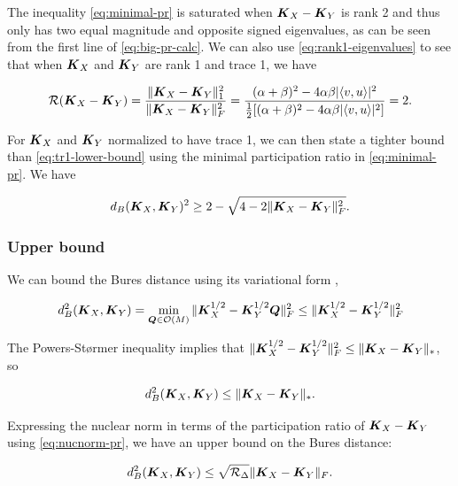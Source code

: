 The inequality \cref{eq:minimal-pr} is saturated when $\boldsymbol{K}_X-\boldsymbol{K}_Y$ is rank 2 and thus only has two equal magnitude and opposite signed eigenvalues, as can be seen from the first line of \cref{eq:big-pr-calc}.  
We can also use \cref{eq:rank1-eigenvalues} to see that when $\boldsymbol{K}_X$ and $\boldsymbol{K}_Y$ are rank 1 and trace 1, we have

\begin{equation}
    \mathcal{R}(\boldsymbol{K}_X-\boldsymbol{K}_Y) = \frac{\| \boldsymbol{K}_X-\boldsymbol{K}_Y \|_{1}^{2} }{\| \boldsymbol{K}_X-\boldsymbol{K}_Y \|_F^2}  =\frac{ (\alpha + \beta)^2 - 4 \alpha \beta \lvert \langle v,u \rangle \lvert^2}{\frac{1}{2} [(\alpha + \beta)^2 - 4 \alpha \beta \lvert \langle v,u \rangle \lvert^2]} = 2.
\end{equation}

For $\boldsymbol{K}_X$ and $\boldsymbol{K}_Y$ normalized to have trace 1, we can then state a tighter bound than \cref{eq:tr1-lower-bound} using the minimal participation ratio in \cref{eq:minimal-pr}.  We have

\begin{equation}
        d_B(\boldsymbol{K}_X,\boldsymbol{K}_Y)^2 \ge 2 - \sqrt{4 - 2 \|\boldsymbol{K}_X-\boldsymbol{K}_Y \|_F^2}.
\end{equation}



\subsubsection{Upper bound}

We can bound the Bures distance using its variational form \cite{Bhatia2019},

\begin{equation}\label{eq:bures-variational}
d_B^2(\boldsymbol{K}_X,\boldsymbol{K}_Y) = \min_{\boldsymbol{Q} \in \mathcal{O}(M)} \|\boldsymbol{K}_X^{1/2} - \boldsymbol{K}_Y^{1/2}\boldsymbol{Q} \|_F^2 \le  \|\boldsymbol{K}_X^{1/2} - \boldsymbol{K}_Y^{1/2} \|_F^2
\end{equation}

The Powers-St\o rmer inequality implies that $\|\boldsymbol{K}_X^{1/2} - \boldsymbol{K}_Y^{1/2} \|_F^2 \le \| \boldsymbol{K}_X-\boldsymbol{K}_Y \|_*$, so 

\begin{equation}\label{eq:bures-nucnorm}
    d_B^2(\boldsymbol{K}_X,\boldsymbol{K}_Y) \le \| \boldsymbol{K}_X-\boldsymbol{K}_Y \|_*.
\end{equation}

Expressing the nuclear norm in terms of the participation ratio of $\boldsymbol{K}_X - \boldsymbol{K}_Y$ using \cref{eq:nucnorm-pr}, we have an upper bound on the Bures distance:

\begin{equation}
    d_B^2(\boldsymbol{K}_X,\boldsymbol{K}_Y) \le \sqrt{\mathcal{R}_\Delta}\| \boldsymbol{K}_X-\boldsymbol{K}_Y \|_F.
\end{equation}

